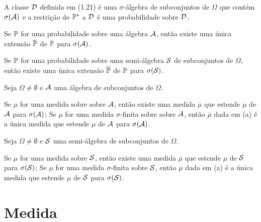 \begin{theorem}
	A classe $\Dcal$ definida em (1.21) é uma $\sigma$-álgebra de subconjuntos de $\Omega$ que contém $\sigma(\Acal)$ e a restrição de $\P^*$ a $\Dcal$ é uma probabilidade sobre $\Dcal$.
\end{theorem}

\begin{theorem}
	Se $\P$ for uma probabilidade sobre uma álgebra $\Acal$, então existe uma única extensão $\overline{\P}$ de $\P$ para $\sigma(\Acal)$.
\end{theorem}

\begin{corollary}
	Se $\P$ for uma probabilidade sobre uma semi-álgebra $\Scal$ de subconjuntos de $\Omega$, então existe uma única extensão $\overline{\P}$ de $\P$ para $\sigma(\Scal)$.
\end{corollary}

\begin{theorem}
	Seja $\Omega \neq \emptyset$ e $\Acal$ uma álgebra de subconjuntos de $\Omega$.
	\begin{outline}[enumerate]
		\1 Se $\mu$ for uma medida sobre sobre $\Acal$, então existe uma medida $\overline{\mu}$ que estende $\mu$ de $\Acal$ para $\sigma(\Acal)$;
		\1 Se $\mu$ for uma medida $\sigma$-finita sobre sobre $\Acal$, então $\overline{\mu}$ dada em (a) é a única medida que estende $\mu$ de $\Acal$ para $\sigma(\Acal)$.
	\end{outline}
\end{theorem}

\begin{corollary}
	Seja $\Omega \neq \emptyset$ e $\Scal$ uma semi-álgebra de subconjuntos de $\Omega$.
	\begin{outline}[enumerate]
		\1 Se $\mu$ for uma medida sobre $\Scal$, então existe uma medida $\overline{\mu}$ que estende $\mu$ de $\Scal$ para $\sigma(\Scal)$;
		\1 Se $\mu$ for uma medida $\sigma$-finita sobre $\Scal$, então $\overline{\mu}$ dada em (a) é a única medida que estende $\mu$ de $\Scal$ para $\sigma(\Scal)$.
	\end{outline}
\end{corollary}



\section{Medida}

